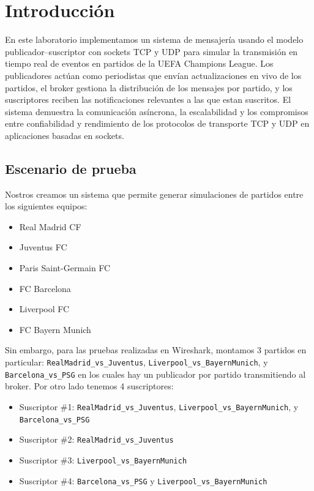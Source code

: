 \documentclass[10pt]{article}
\begin{document}
\section*{Introducción}
En este laboratorio implementamos un sistema de mensajería usando el modelo publicador–suscriptor con sockets TCP y UDP para simular la transmisión en tiempo real de eventos en partidos de la UEFA Champions League.  Los publicadores actúan como periodistas que envían actualizaciones en vivo de los partidos, el broker gestiona la distribución de los mensajes por partido, y los suscriptores reciben las notificaciones relevantes a las que estan suscritos. El sistema demuestra la comunicación asíncrona, la escalabilidad y los compromisos entre confiabilidad y rendimiento de los protocolos de transporte TCP y UDP en aplicaciones basadas en sockets.

\subsection*{Escenario de prueba}
Nostros creamos un sistema que permite generar simulaciones de partidos entre los siguientes equipos:
\begin{itemize}
    \item Real Madrid CF
    \item Juventus FC
    \item Paris Saint-Germain FC
    \item FC Barcelona
    \item Liverpool FC
    \item FC Bayern Munich
\end{itemize}

Sin embargo, para las pruebas realizadas en Wireshark, montamos 3 partidos en particular:
\texttt{RealMadrid\_vs\_Juventus}, \texttt{Liverpool\_vs\_BayernMunich}, y \texttt{Barcelona\_vs\_PSG} en los cuales hay un publicador por partido transmitiendo al broker. Por otro lado tenemos 4 suscriptores:

\begin{itemize}
    \item Suscriptor \#1: \texttt{RealMadrid\_vs\_Juventus}, \texttt{Liverpool\_vs\_BayernMunich}, y \texttt{Barcelona\_vs\_PSG}
     \item Suscriptor \#2: \texttt{RealMadrid\_vs\_Juventus}
     \item Suscriptor \#3: \texttt{Liverpool\_vs\_BayernMunich}
     \item Suscriptor \#4: \texttt{Barcelona\_vs\_PSG} y \texttt{Liverpool\_vs\_BayernMunich}    
\end{itemize}
\end{document}
